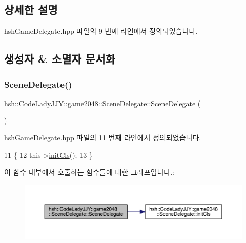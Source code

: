 \subsection{상세한 설명}


hsh\+Game\+Delegate.\+hpp 파일의 9 번째 라인에서 정의되었습니다.



\subsection{생성자 \& 소멸자 문서화}
\mbox{\label{classhsh_1_1_code_lady_j_j_y_1_1game2048_1_1_scene_delegate_afa15a8d40890d55355083d2edfe001e0}} 
\subsubsection{\texorpdfstring{Scene\+Delegate()}{SceneDelegate()}}
{\footnotesize\ttfamily hsh\+::\+Code\+Lady\+J\+J\+Y\+::game2048\+::\+Scene\+Delegate\+::\+Scene\+Delegate (\begin{DoxyParamCaption}{ }\end{DoxyParamCaption})\hspace{0.3cm}{\ttfamily [inline]}}



hsh\+Game\+Delegate.\+hpp 파일의 11 번째 라인에서 정의되었습니다.


\begin{DoxyCode}
11                                \{
12                     this->\hyperlink{classhsh_1_1_code_lady_j_j_y_1_1game2048_1_1_scene_delegate_ab5504cff24fa2c916c0c6139aff67a4e}{initCls}();
13                 \}
\end{DoxyCode}
이 함수 내부에서 호출하는 함수들에 대한 그래프입니다.\+:
\nopagebreak
\begin{figure}[H]
\begin{center}
\leavevmode
\includegraphics[width=350pt]{d7/d4d/classhsh_1_1_code_lady_j_j_y_1_1game2048_1_1_scene_delegate_afa15a8d40890d55355083d2edfe001e0_cgraph}
\end{center}
\end{figure}


